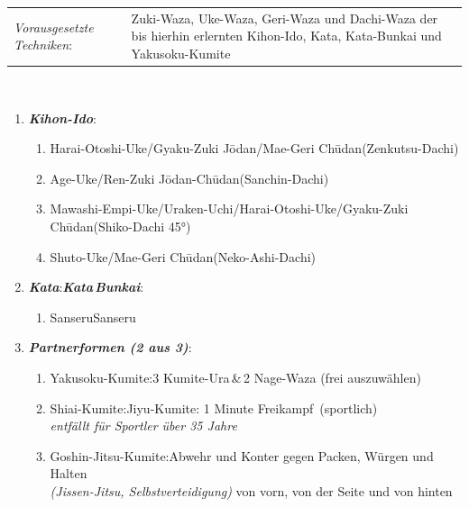 \documentclass[a5paper,landscape,DIV=calc,11pt,notitlepage]{scrartcl}
\begin{document}
\begin{tcolorbox}[colback=white,colframe=BKBELT,coltitle=white,title=1. Dan: Schwarz]
	\renewcommand{\labelenumi}{\alph{enumi}.)}
	\renewcommand{\labelenumii}{\arabic*.}
	{\scriptsize 
	\begin{tabularx}{\textwidth}{lX}
		\textit{Vorausgesetzte Techniken}:& Zuki-Waza, Uke-Waza, Geri-Waza und Dachi-Waza der bis hierhin erlernten Kihon-Ido, Kata, Kata-Bunkai und Yakusoku-Kumite
	\end{tabularx}\\}
	\begin{enumerate}[nosep]
		\item \textit{\textbf{Kihon-Ido}}:
		\begin{enumerate}[nosep]
			\item Harai-Otoshi-Uke/Gyaku-Zuki J\={o}dan/Mae-Geri Ch\={u}dan\tabto{335pt}(Zenkutsu-Dachi)
			\item Age-Uke/Ren-Zuki J\={o}dan-Ch\={u}dan\tabto{335pt}(Sanchin-Dachi)
			\item Mawashi-Empi-Uke/Uraken-Uchi/Harai-Otoshi-Uke/Gyaku-Zuki Ch\={u}dan\tabto{335pt}(Shiko-Dachi 45°)
		\item Shuto-Uke/Mae-Geri Ch\={u}dan\tabto{335pt}(Neko-Ashi-Dachi)
		\end{enumerate}
		\vspace{12pt}
		\item \textit{\textbf{Kata}}:\tabto{200pt}\textit{\textbf{Kata\,Bunkai}}:
		\begin{enumerate}[nosep]
			\item Sanseru\tabto{200pt}Sanseru
		\end{enumerate}
		\vspace{12pt}
		\item \textit{\textbf{Partnerformen (2 aus 3)}}:
		\begin{enumerate}[nosep]
			\item Yakusoku-Kumite:\tabto{200pt}3 Kumite-Ura\,\&\,2 Nage-Waza (frei auszuwählen)
			\item Shiai-Kumite:\tabto{200pt}Jiyu-Kumite: 1 Minute \frqq Freikampf\flqq~(sportlich)\\\tabto{200pt}\textit{entfällt für Sportler über 35 Jahre}
			\item Goshin-Jitsu-Kumite:\tabto{200pt}Abwehr und Konter gegen Packen, Würgen und Halten\\\textit{(Jissen-Jitsu, Selbstverteidigung)}\tabto{200pt} von vorn, von der Seite und von hinten

\end{enumerate}
\end{enumerate}
\end{tcolorbox}
\end{document}
